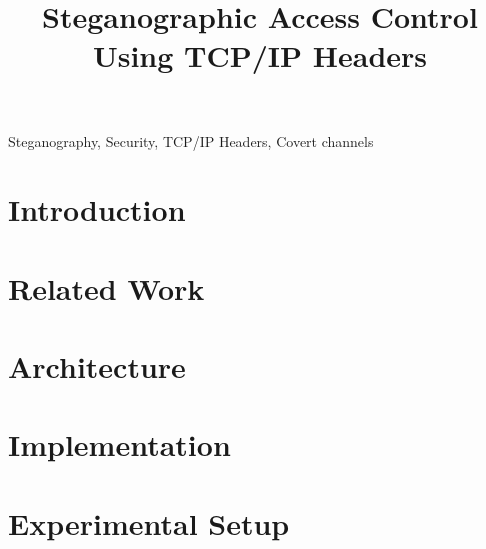 \documentclass[conference]{IEEEtran}
\begin{document}
\title{Steganographic Access Control Using TCP/IP Headers}

\author{
}

\maketitle

\begin{abstract}

\end{abstract}


\begin{IEEEkeywords}
Steganography, Security, TCP/IP Headers, Covert channels
\end{IEEEkeywords}


\section{Introduction}
\label{sec:introduction}


\section{Related Work}
\label{sec:related}


\section{Architecture}
\label{sec:architecture}


\section{Implementation}
\label{sec:implementation}


\section{Experimental Setup}
\label{sec:setup}

\end{document}
